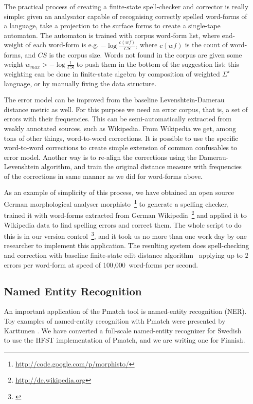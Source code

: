 \documentclass{llncs}
\begin{document}
The practical process of creating a finite-state spell-checker and corrector
is really simple: given an analysator capable of recognising correctly spelled
word-forms of a language, take a projection to the surface forms to create a
single-tape automaton. The automaton is trained with corpus word-form list, 
where end-weight of each word-form is e.g. $-\log\frac{c(wf)}{CS}$, where 
$c(wf)$ is the count of word-forms, and $CS$ is the corpus size. Words not
found in the corpus are given some weight $w_{max} > -\log\frac{1}{CS}$ to
push them in the bottom of the suggestion list; this weighting can be done
in finite-state algebra by composition of weighted $\Sigma^{\star}$ language,
or by manually fixing the data structure.

The error model can be improved from the baseline Levenshtein-Damerau distance
metric as well. For this purpose we need an error corpus, that is, a set of
errors with their frequencies. This can be semi-automatically extracted from
weakly annotated sources, such as Wikipedia. From Wikipedia we get, among tons
of other things, word-to-word corrections. It is possible to use the specific
word-to-word corrections to create simple extension of common confusables to
error model. Another way is to re-align the corrections using the
Damerau-Levenshtein algorithm, and train the original distance measure with
frequencies of the corrections in same manner as we did for word-forms above.

As an example of simplicity of this process, we have obtained an open source
German morphological analyser
morphisto~\footnote{\url{http://code.google.com/p/morphisto/}} to generate a
spelling checker, trained it with word-forms extracted from German
Wikipedia~\footnote{\url{http://de.wikipedia.org}} and applied it to Wikipedia
data to find spelling errors and correct them. The whole
script to do this is in our version control~\footnote{\url{}}, and it took us
no more than one work day by one researcher to implement this application.
The resulting system does spell-checking and correction with baseline
finite-state edit distance algorithm~\cite{pirinen/2010finitestate} applying
up to 2 errors per word-form at speed of 100,000~word-forms per second.

\subsection{Named Entity Recognition}

An important application of the Pmatch tool is named-entity
recognition (NER). Toy examples of named-entity recognition with
Pmatch were presented by Karttunen \cite{karttunen/2011}. We have
converted a full-scale named-entity recognizer for Swedish to use the
HFST implementation of Pmatch, and we are writing one for Finnish.
\end{document}
